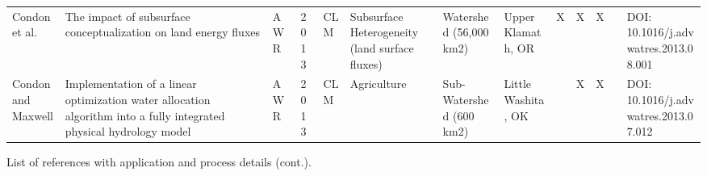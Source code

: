 {\begin{table}
\begin{tabular}{ p{1cm} p{2cm} l l p{1cm} p{1.5cm} p{1cm} p{1cm} | c | c | c | c | p{1cm} }
Condon et al. & The impact of subsurface conceptualization on land energy fluxes & AWR & 2013 & CLM & Subsurface Heterogeneity (land surface fluxes) & Watershed (56,000 km2) & Upper Klamath, OR & X & X & X & & DOI: 10.1016/j.advwatres.2013.08.001  \\
Condon and Maxwell & Implementation of a linear optimization water allocation algorithm into a fully integrated physical hydrology model & AWR & 2013 & CLM & Agriculture & Sub-Watershed (600 km2) & Little Washita, OK &  & X & X & & DOI: 10.1016/j.advwatres.2013.07.012   \\
\end{tabular}
\label{pfref1}
\end{table}

\begin{table} \center
\caption{List of \parflow{} references with application and process details (cont.).}


\end{table}}
